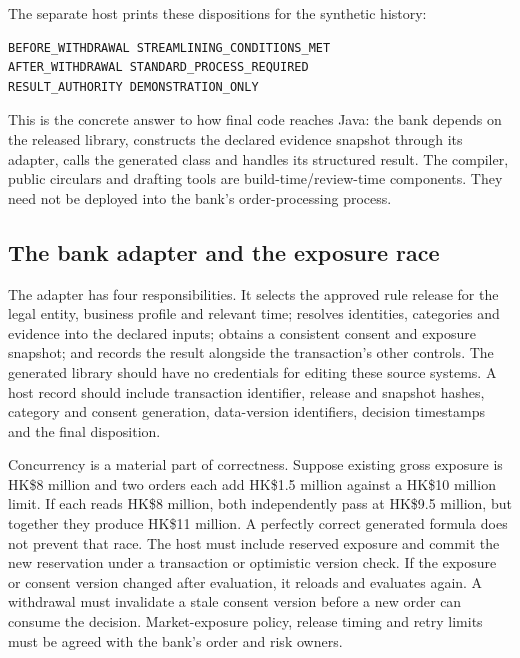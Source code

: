 The separate host prints these dispositions for the synthetic history:
\begin{lstlisting}
BEFORE_WITHDRAWAL STREAMLINING_CONDITIONS_MET
AFTER_WITHDRAWAL STANDARD_PROCESS_REQUIRED
RESULT_AUTHORITY DEMONSTRATION_ONLY
\end{lstlisting}
This is the concrete answer to how final code reaches Java: the bank depends on
the released library, constructs the declared evidence snapshot through its
adapter, calls the generated class and handles its structured result. The
compiler, public circulars and drafting tools are build-time/review-time
components. They need not be deployed into the bank's order-processing process.

\subsection{The bank adapter and the exposure race}

The adapter has four responsibilities. It selects the approved rule release for
the legal entity, business profile and relevant time; resolves identities,
categories and evidence into the declared inputs; obtains a consistent consent
and exposure snapshot; and records the result alongside the transaction's other
controls. The generated library should have no credentials for editing these
source systems. A host record should include transaction identifier, release and
snapshot hashes, category and consent generation, data-version identifiers,
decision timestamps and the final disposition.

Concurrency is a material part of correctness. Suppose existing gross exposure
is HK\$8 million and two orders each add HK\$1.5 million against a HK\$10 million
limit. If each reads HK\$8 million, both independently pass at HK\$9.5 million,
but together they produce HK\$11 million. A perfectly correct generated formula
does not prevent that race. The host must include reserved exposure and commit
the new reservation under a transaction or optimistic version check. If the
exposure or consent version changed after evaluation, it reloads and evaluates
again. A withdrawal must invalidate a stale consent version before a new order
can consume the decision. Market-exposure policy, release timing and retry limits
must be agreed with the bank's order and risk owners.

